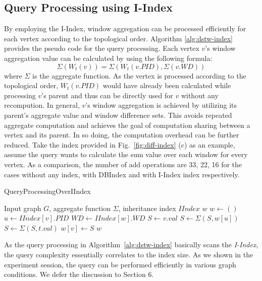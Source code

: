 \subsection{Query Processing using I-Index}

By employing the I-Index, window aggregation can be processed efficiently 
for each vertex according to 
the topological order. Algorithm \ref{alg:dstw-index} 
provides the pseudo code for the query processing. 
Each vertex $v$'s window aggregation value can be calculated 
by using the following formula: 
\begin{equation}
\Sigma (W_t(v)) = \Sigma (W_t(v.PID),\Sigma(v.WD))
\end{equation}
where $\Sigma$ is the aggregate function. As the vertex is 
processed according to the topological order, $W_t(v.PID)$ 
would have already been calculated while processing $v$'s parent and 
thus can be directly used for $v$ without any recompution. 
In general, $v$'s window aggregation is achieved by utilizing its 
parent's aggregate value and window difference sets. 
This avoids repeated aggregate computation and achieves 
the goal of computation sharing between a vertex and its parent. 
In so doing, the computation overhead can be further reduced. 
Take the index  provided in Fig.~\ref{fig:diff-index} (c) as an example, 
assume the query wants to calculate the sum value over each window 
for every vertex. As a comparison, the number of add operations 
are 33, 22, 16 for the cases without any index, 
with DBIndex and with I-Index index respectively. 


\begin{algorithm}
\caption{QueryProcessingOverIIndex}
\begin{algorithmic}[1]
\Require Input graph $G$, aggregate function $\Sigma$, inheritance index $IIndex$ 
\Ensure $w$ 
\State $w \leftarrow ()$
 \label{code:dstw-index-tp1}
	\State $u \leftarrow IIndex[v].PID$
	\State $WD \leftarrow IIndex[w].WD$
	\State $S \leftarrow v.val$
	\State $S \leftarrow \Sigma(S, w[u])$
	 \label{code:dstw-index-tp2}
		\State $S\leftarrow \Sigma(S, t.val)$
	\EndFor
	\State $w[v] \leftarrow S$
\EndFor
\Return $w$
\end{algorithmic}
\label{alg:dstw-index}
\end{algorithm}

As the query processing in Algorithm~\ref{alg:dstw-index} basically scans the \emph{I-Index}, the query
complexity essentially correlates to the index size. As we shown in the experiment session, the query can be performed efficiently 
in various graph conditions. We defer the discussion to Section 6.


